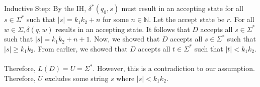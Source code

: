 \begin{enumerate}
\begin{enumerate}
\\ \\
Inductive Step: By the IH, $\delta^*(q_0, s)$ must result in an accepting state for all $s \in \Sigma^*$ such that $|s| = k_1k_2 + n$ for some $n \in \mathbb{N}$. Let the accept state be $r$. For all $w \in \Sigma, \delta(q, w)$ results in an accepting state. It follows that $D$ accepts all $s \in \Sigma^*$ such that $|s| = k_1k_2+n+1$. Now, we showed that $D$ accepts all $s \in \Sigma^*$ such that $|s| \ge k_1k_2$. From earlier, we showed that $D$ accepts all $t \in \Sigma^*$ such that $|t| < k_1k_2$. 
\\ \\
Therefore, $L(D) = U = \Sigma^*$. However, this is a contradiction to our assumption. Therefore, $U$ excludes some string $s$ where $|s| < k_1k_2$. 

\end{enumerate}

\end{enumerate}
